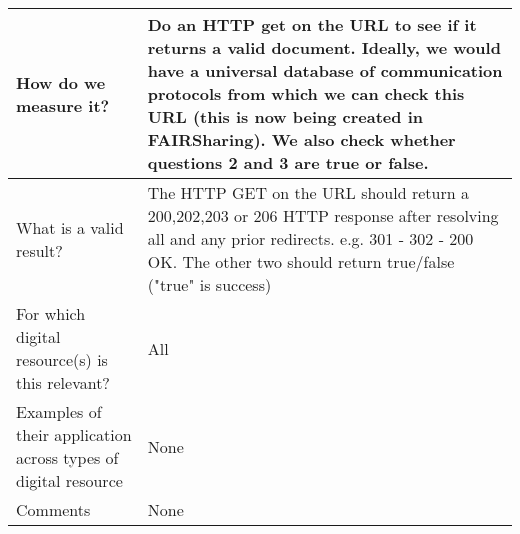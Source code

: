 \documentclass[english]{article}
\begin{document}
\begin{longtable}{|p{5cm}|p{9cm}|}
\\



\hline
How do we measure it? &  

Do an HTTP get on the URL to see if it returns a valid document. Ideally, we would have a universal database of communication protocols from which we can check this URL (this is now being created in FAIRSharing). We also check whether questions 2 and 3 are true or false.  


\\



\hline
What is a valid result? &  



The HTTP GET on the URL should return a 200,202,203 or 206 HTTP response after resolving all and any prior redirects. e.g. 301 - 302 - 200 OK. The other two should return true/false ("true" is success)


\\



\hline
For which digital resource(s) is this relevant? &  All\\



\hline
Examples of their application across types of digital resource &  None

\\



\hline

Comments & None 

\\
\hline

\end{longtable}




\newpage
\end{document}
